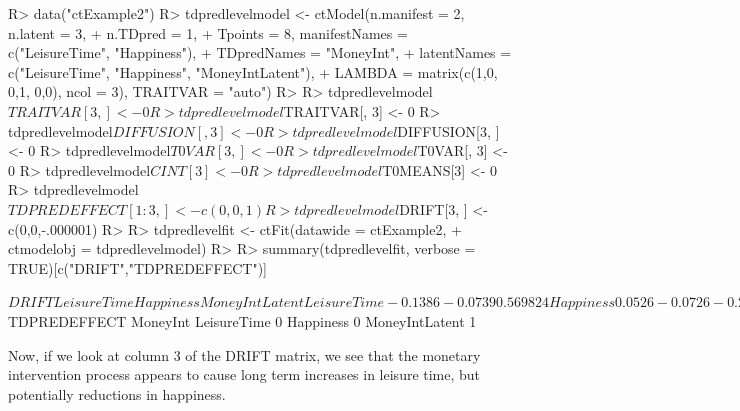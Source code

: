 \documentclass[nojss]{jss}\usepackage[]{graphicx}\usepackage[]{color}
\begin{document}
\begin{Schunk}
\begin{Sinput}
R> data("ctExample2")
R> tdpredlevelmodel <- ctModel(n.manifest = 2, n.latent = 3, 
+   n.TDpred = 1, 
+   Tpoints = 8, manifestNames = c("LeisureTime", "Happiness"), 
+   TDpredNames = "MoneyInt", 
+   latentNames = c("LeisureTime", "Happiness", "MoneyIntLatent"),
+   LAMBDA = matrix(c(1,0, 0,1, 0,0), ncol = 3), TRAITVAR = "auto")
R> 
R> tdpredlevelmodel$TRAITVAR[3, ] <- 0
R> tdpredlevelmodel$TRAITVAR[, 3] <- 0
R> tdpredlevelmodel$DIFFUSION[, 3] <- 0
R> tdpredlevelmodel$DIFFUSION[3, ] <- 0
R> tdpredlevelmodel$T0VAR[3, ] <- 0
R> tdpredlevelmodel$T0VAR[, 3] <- 0
R> tdpredlevelmodel$CINT[3] <- 0
R> tdpredlevelmodel$T0MEANS[3] <- 0
R> tdpredlevelmodel$TDPREDEFFECT[1:3, ] <- c(0,0,1)
R> tdpredlevelmodel$DRIFT[3, ] <- c(0,0,-.000001)
R> 
R> tdpredlevelfit <- ctFit(datawide = ctExample2, 
+   ctmodelobj = tdpredlevelmodel)
R> 
R> summary(tdpredlevelfit, verbose = TRUE)[c("DRIFT","TDPREDEFFECT")]
\end{Sinput}
\begin{Soutput}
$DRIFT
               LeisureTime Happiness MoneyIntLatent
LeisureTime        -0.1386   -0.0739       0.569824
Happiness           0.0526   -0.0726      -0.290856
MoneyIntLatent      0.0000    0.0000      -0.000001

$TDPREDEFFECT
               MoneyInt
LeisureTime           0
Happiness             0
MoneyIntLatent        1
\end{Soutput}
\end{Schunk}

Now, if we look at column 3 of the DRIFT matrix, we see that the monetary intervention process appears to cause long term increases in leisure time, but potentially reductions in happiness. 
\end{document}
